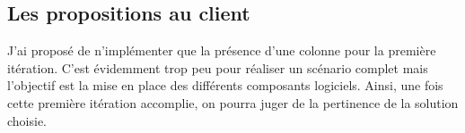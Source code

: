 \subsection{Les propositions au client}
\label{subsec:proposals-to-customer}

    J'ai proposé de n'implémenter que la présence d'une colonne pour la première itération.
    C'est évidemment trop peu pour réaliser un scénario complet mais l'objectif est la mise en place des différents composants logiciels.
    Ainsi, une fois cette première itération accomplie, on pourra juger de la pertinence de la solution choisie.
